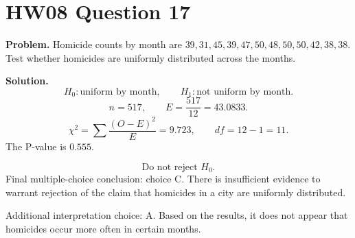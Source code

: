 \documentclass[11pt]{article}
\begin{document}
\section*{HW08 Question 17}

\textbf{Problem.} Homicide counts by month are \(39,31,45,39,47,50,48,50,50,42,38,38\). Test whether homicides are uniformly distributed across the months.

\textbf{Solution.}
\[
H_0:\text{uniform by month},\qquad H_1:\text{not uniform by month}.
\]
\[
n=517,\qquad E=\frac{517}{12}=43.0833.
\]
\[
\chi^2=\sum\frac{(O-E)^2}{E}=9.723,\qquad df=12-1=11.
\]
The P-value is \(0.555\).

\[
\boxed{\text{Do not reject }H_0.}
\]
Final multiple-choice conclusion: choice C. There is insufficient evidence to warrant rejection of the claim that homicides in a city are uniformly distributed.

Additional interpretation choice: A. Based on the results, it does not appear that homicides occur more often in certain months.
\end{document}
